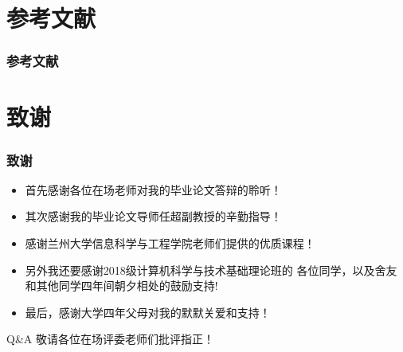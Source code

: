 \documentclass[14pt, AutoFakeBold]{ppt}
\begin{document}
\section{参考文献}
\begin{frame}[t]
  \frametitle{参考文献}
  
  
  
\end{frame}

\section{致谢}

\begin{frame}
\frametitle{致谢}
  \begin{itemize}
  \item 首先感谢各位在场老师对我的毕业论文答辩的聆听！
  \item 其次感谢我的毕业论文导师任超副教授的辛勤指导！
  \item 感谢兰州大学信息科学与工程学院老师们提供的优质课程！
  \item 另外我还要感谢2018级计算机科学与技术基础理论班的
  各位同学，以及舍友和其他同学四年间朝夕相处的鼓励支持!
  \item 最后，感谢大学四年父母对我的默默关爱和支持！
  \end{itemize}
  \rightline{}
  \begin{block}{Q\&A}
    敬请各位在场评委老师们批评指正！
  \end{block}
\end{frame}
\end{document}
